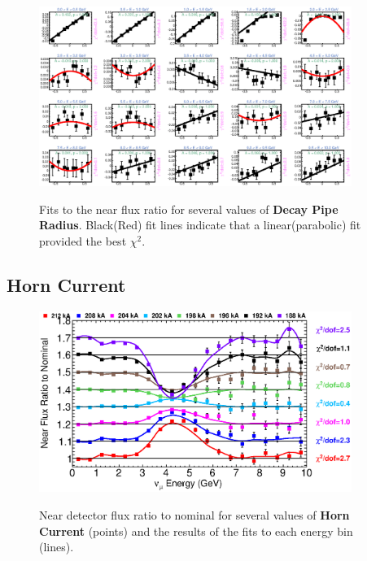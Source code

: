 \begin{figure}[hb]
  \begin{center}
    {\includegraphics[width=4.0in]{figures/DecayPipeRadius_near_fits.eps}}
  \end{center}
\caption{ Fits to the near flux ratio for several values of {\bf Decay Pipe Radius}. Black(Red) fit lines indicate that a linear(parabolic) fit provided the best $\chi^2$. }
\end{figure}

\clearpage
\subsection{Horn Current}

\begin{figure}[ht]
  \begin{center}
    {\includegraphics[width=4.0in]{figures/HornCurrent_near_summary.eps}}
  \end{center}
\caption{ Near detector flux ratio to nominal for several values of {\bf Horn Current} (points) and the results of the fits to each energy bin (lines).}
\end{figure}

